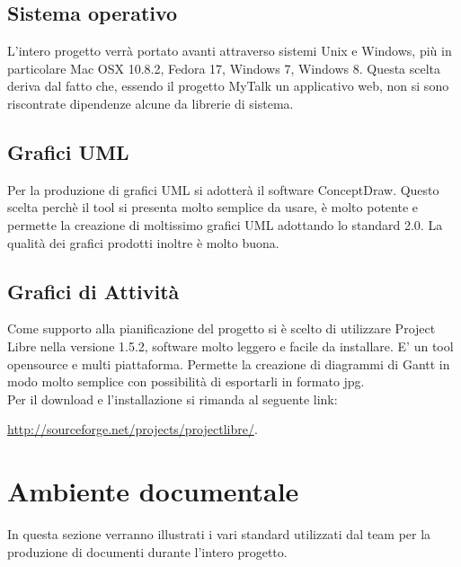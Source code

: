 \subsection{Sistema operativo}
L'intero progetto verrà portato avanti attraverso sistemi Unix e Windows, più in particolare Mac OSX 10.8.2, Fedora 17, Windows 7, Windows 8. Questa scelta deriva dal fatto che, essendo il progetto MyTalk un applicativo web, non si sono riscontrate dipendenze alcune da librerie di sistema.

\subsection{Grafici UML}
Per la produzione di grafici UML si adotterà il software ConceptDraw. Questo scelta perchè il tool si presenta molto semplice da usare, è molto potente e permette la creazione di moltissimo grafici UML adottando lo standard 2.0. La qualità dei grafici prodotti inoltre è molto buona.

\subsection{Grafici di Attività}
Come supporto alla pianificazione del progetto si è scelto di utilizzare Project Libre nella versione 1.5.2, software molto leggero e facile da installare. E' un tool opensource e multi piattaforma. Permette la creazione di diagrammi di Gantt in modo molto semplice con possibilità di esportarli in formato jpg.\\
Per il download e l'installazione si rimanda al seguente link:
\begin{center}
\url{http://sourceforge.net/projects/projectlibre/}.
\end{center}

\newpage
\section{Ambiente documentale}
\label{sec:ambiente_documentale}
In questa sezione verranno illustrati i vari standard utilizzati dal team per la produzione di documenti durante l'intero progetto. 

